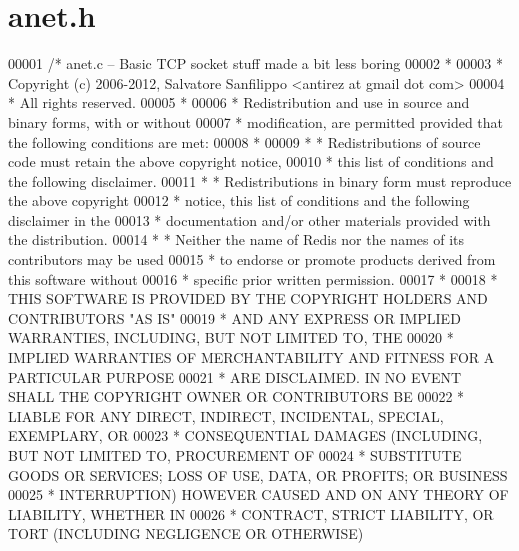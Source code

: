 \hypertarget{anet_8h_source}{}\section{anet.\+h}
\label{anet_8h_source}

\begin{DoxyCode}
00001 \textcolor{comment}{/* anet.c -- Basic TCP socket stuff made a bit less boring}
00002 \textcolor{comment}{ *}
00003 \textcolor{comment}{ * Copyright (c) 2006-2012, Salvatore Sanfilippo <antirez at gmail dot com>}
00004 \textcolor{comment}{ * All rights reserved.}
00005 \textcolor{comment}{ *}
00006 \textcolor{comment}{ * Redistribution and use in source and binary forms, with or without}
00007 \textcolor{comment}{ * modification, are permitted provided that the following conditions are met:}
00008 \textcolor{comment}{ *}
00009 \textcolor{comment}{ *   * Redistributions of source code must retain the above copyright notice,}
00010 \textcolor{comment}{ *     this list of conditions and the following disclaimer.}
00011 \textcolor{comment}{ *   * Redistributions in binary form must reproduce the above copyright}
00012 \textcolor{comment}{ *     notice, this list of conditions and the following disclaimer in the}
00013 \textcolor{comment}{ *     documentation and/or other materials provided with the distribution.}
00014 \textcolor{comment}{ *   * Neither the name of Redis nor the names of its contributors may be used}
00015 \textcolor{comment}{ *     to endorse or promote products derived from this software without}
00016 \textcolor{comment}{ *     specific prior written permission.}
00017 \textcolor{comment}{ *}
00018 \textcolor{comment}{ * THIS SOFTWARE IS PROVIDED BY THE COPYRIGHT HOLDERS AND CONTRIBUTORS "AS IS"}
00019 \textcolor{comment}{ * AND ANY EXPRESS OR IMPLIED WARRANTIES, INCLUDING, BUT NOT LIMITED TO, THE}
00020 \textcolor{comment}{ * IMPLIED WARRANTIES OF MERCHANTABILITY AND FITNESS FOR A PARTICULAR PURPOSE}
00021 \textcolor{comment}{ * ARE DISCLAIMED. IN NO EVENT SHALL THE COPYRIGHT OWNER OR CONTRIBUTORS BE}
00022 \textcolor{comment}{ * LIABLE FOR ANY DIRECT, INDIRECT, INCIDENTAL, SPECIAL, EXEMPLARY, OR}
00023 \textcolor{comment}{ * CONSEQUENTIAL DAMAGES (INCLUDING, BUT NOT LIMITED TO, PROCUREMENT OF}
00024 \textcolor{comment}{ * SUBSTITUTE GOODS OR SERVICES; LOSS OF USE, DATA, OR PROFITS; OR BUSINESS}
00025 \textcolor{comment}{ * INTERRUPTION) HOWEVER CAUSED AND ON ANY THEORY OF LIABILITY, WHETHER IN}
00026 \textcolor{comment}{ * CONTRACT, STRICT LIABILITY, OR TORT (INCLUDING NEGLIGENCE OR OTHERWISE)}

\end{DoxyCode}
